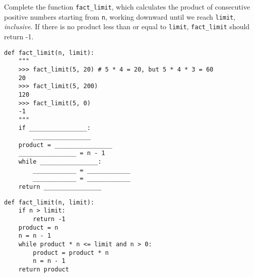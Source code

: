\question Complete the function \lstinline{fact_limit}, which calculates the product of consecutive positive numbers starting from \lstinline{n}, working downward until we reach \lstinline{limit}, \textit{inclusive}. If there is no product less than or equal to \lstinline{limit}, \lstinline{fact_limit} should return -1.

\begin{blocksection}
\begin{lstlisting}
def fact_limit(n, limit):
    """
    >>> fact_limit(5, 20) # 5 * 4 = 20, but 5 * 4 * 3 = 60
    20
    >>> fact_limit(5, 200)
    120
    >>> fact_limit(5, 0)
    -1
    """
    if ________________:
        ________________
    product = ________________
    ________________ = n - 1
    while ________________:
        ____________ = ____________  
        ____________ = ____________
    return ________________

\end{lstlisting}
\end{blocksection}

\begin{blocksection}
\begin{solution}
\begin{lstlisting}
def fact_limit(n, limit):
    if n > limit:
        return -1
    product = n
    n = n - 1
    while product * n <= limit and n > 0:
        product = product * n  
        n = n - 1
    return product
\end{lstlisting}
\end{solution}
\end{blocksection}